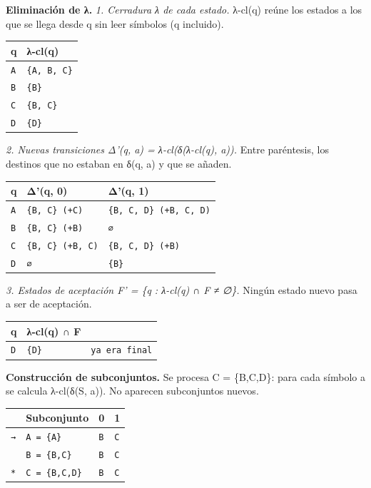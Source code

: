 \documentclass[11pt]{article}
\begin{document}
\textbf{Eliminación de λ.} \textit{1. Cerradura λ de cada estado.} λ-cl(q) reúne los estados a los que se llega desde q sin leer símbolos (q incluido).
\begin{center}\footnotesize\begin{tabular}{ll}\toprule
q & λ-cl(q) \\\midrule
\texttt{A} & \texttt{\{A, B, C\}} \\
\texttt{B} & \texttt{\{B\}} \\
\texttt{C} & \texttt{\{B, C\}} \\
\texttt{D} & \texttt{\{D\}} \\
\bottomrule\end{tabular}\end{center}
\textit{2. Nuevas transiciones Δ'(q, a) = λ-cl(δ(λ-cl(q), a)).} Entre paréntesis, los destinos que no estaban en δ(q, a) y que se añaden.
\begin{center}\footnotesize\begin{tabular}{lll}\toprule
q & Δ'(q, 0) & Δ'(q, 1) \\\midrule
\texttt{A} & \texttt{\{B, C\}  (+C)} & \texttt{\{B, C, D\}  (+B, C, D)} \\
\texttt{B} & \texttt{\{B, C\}  (+B)} & \texttt{∅} \\
\texttt{C} & \texttt{\{B, C\}  (+B, C)} & \texttt{\{B, C, D\}  (+B)} \\
\texttt{D} & \texttt{∅} & \texttt{\{B\}} \\
\bottomrule\end{tabular}\end{center}
\textit{3. Estados de aceptación F' = \{q : λ-cl(q) ∩ F ≠ ∅\}.} Ningún estado nuevo pasa a ser de aceptación.
\begin{center}\footnotesize\begin{tabular}{lll}\toprule
q & λ-cl(q) ∩ F &  \\\midrule
\texttt{D} & \texttt{\{D\}} & \texttt{ya era final} \\
\bottomrule\end{tabular}\end{center}
\textbf{Construcción de subconjuntos.} Se procesa C = \{B,C,D\}: para cada símbolo a se calcula λ-cl(δ(S, a)). No aparecen subconjuntos nuevos.
\begin{center}\footnotesize\begin{tabular}{llll}\toprule
 & Subconjunto & 0 & 1 \\\midrule
\texttt{→} & \texttt{A = \{A\}} & \texttt{B} & \texttt{C} \\
\texttt{} & \texttt{B = \{B,C\}} & \texttt{B} & \texttt{C} \\
\texttt{*} & \texttt{C = \{B,C,D\}} & \texttt{B} & \texttt{C} \\
\bottomrule\end{tabular}\end{center}
\end{document}
